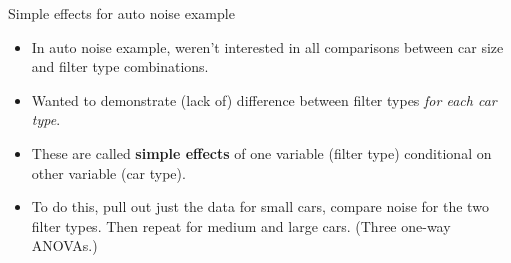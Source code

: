 \documentclass[unknownkeysallowed]{beamer}\usepackage[]{graphicx}\usepackage[]{color}
\makeatletter
\def\maxwidth{ %
  \ifdim\Gin@nat@width>\linewidth
    \linewidth
  \else
    \Gin@nat@width
  \fi
}
\newcommand{\hlopt}[1]{\textcolor[rgb]{0,0,0}{#1}}%
\newcommand{\hlstd}[1]{\textcolor[rgb]{0.345,0.345,0.345}{#1}}%
\newcommand{\hlkwc}[1]{\textcolor[rgb]{0.333,0.667,0.333}{#1}}%
\newcommand{\hlkwd}[1]{\textcolor[rgb]{0.737,0.353,0.396}{\textbf{#1}}}%
\newenvironment{kframe}{%
 \def\at@end@of@kframe{}%
 \ifinner\ifhmode%
  \def\at@end@of@kframe{\end{minipage}}%
  \begin{minipage}{\columnwidth}%
 \fi\fi%
 \def\FrameCommand##1{\hskip\@totalleftmargin \hskip-\fboxsep
 \colorbox{shadecolor}{##1}\hskip-\fboxsep
     \hskip-\linewidth \hskip-\@totalleftmargin \hskip\columnwidth}%
 \MakeFramed {\advance\hsize-\width
   \@totalleftmargin\z@ \linewidth\hsize
   \@setminipage}}%
 {\par\unskip\endMakeFramed%
 \at@end@of@kframe}
\newenvironment{knitrout}{}{} %
\makeatother
\begin{document}


\begin{frame}[fragile]{Simple effects for auto noise example}
  \begin{itemize}
  \item In auto noise example, weren't interested in all comparisons
    between car size and filter type combinations.
  \item Wanted to demonstrate (lack of) difference between filter types
    \emph{for each car type}. 

  \item These are called \textbf{simple effects} of one variable
    (filter type)
    conditional on other variable (car type).

  \item To do this, pull out just the data for small cars, compare
    noise for the two filter types. Then repeat for medium and large
    cars. (Three one-way ANOVAs.)

  \end{itemize}
\end{frame}
\end{document}
